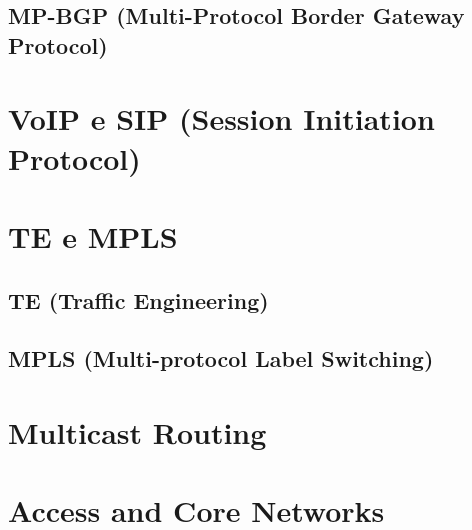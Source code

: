 \documentclass[a4paper, 12pt, onecolumn, oneside]{scrartcl}
\begin{document}
\subsection{MP-BGP (Multi-Protocol Border Gateway Protocol)}

\section{VoIP e SIP (Session Initiation Protocol)}

\section{TE e MPLS}
\subsection{TE (Traffic Engineering)}
\subsection{MPLS (Multi-protocol Label Switching)}

\section{Multicast Routing}

\section{Access and Core Networks}
\end{document}
